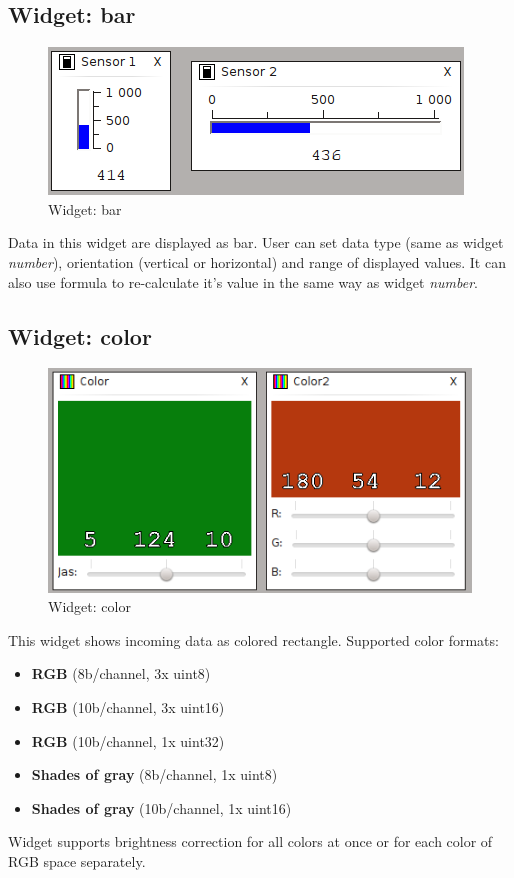 \documentclass[12pt, a4paper, oneside]{article}
\newcommand{\It}{\textit}  %
\begin{document}
\subsection{Widget: bar}
\begin{figure}[H]
\begin{center}
\includegraphics{img/w_bar.png}
\caption{Widget: bar}
\end{center}
\end{figure}
Data in this widget are displayed as bar. User can set data type (same as widget \It{number}), orientation (vertical or horizontal) and range of displayed values. It can also use formula to re-calculate it's value in the same way as widget \It{number}.

\subsection{Widget: color}
\begin{figure}[H]
\begin{center}
\includegraphics{img/w_col.png}
\caption{Widget: color}
\end{center}
\end{figure}
This widget shows incoming data as colored rectangle. Supported color formats:
\begin{itemize}
    \item {\bf RGB} (8b/channel, 3x uint8)
    \item {\bf RGB} (10b/channel, 3x uint16)
    \item {\bf RGB} (10b/channel, 1x uint32)
    \item {\bf Shades of gray} (8b/channel, 1x uint8)
    \item {\bf Shades of gray} (10b/channel, 1x uint16)
\end{itemize}
Widget supports brightness correction for all colors at once or for each color of RGB space separately.
\end{document}

